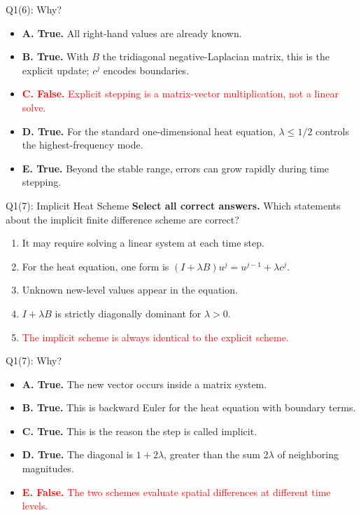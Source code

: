 \documentclass{beamer}
\newcommand{\wrong}[1]{\textcolor{red}{#1}}
\begin{document}
\begin{frame}{Q1(6): Why?}
\small
\begin{itemize}
\item \textbf{A. True.} All right-hand values are already known.
\item \textbf{B. True.} With $B$ the tridiagonal negative-Laplacian
matrix, this is the explicit update; $c^j$ encodes boundaries.
\item \wrong{\textbf{C. False.} Explicit stepping is a matrix-vector
multiplication, not a linear solve.}
\item \textbf{D. True.} For the standard one-dimensional heat
equation, $\lambda\leq1/2$ controls the highest-frequency mode.
\item \textbf{E. True.} Beyond the stable range, errors can grow
rapidly during time stepping.
\end{itemize}
\end{frame}

\begin{frame}{Q1(7): Implicit Heat Scheme}
\small
\textbf{Select all correct answers.} Which statements about the
implicit finite difference scheme are correct?
\begin{enumerate}
\item[A.] It may require solving a linear system at each time step.
\item[B.] For the heat equation, one form is
$(I+\lambda B)u^j=u^{j-1}+\lambda c^j$.
\item[C.] Unknown new-level values appear in the equation.
\item[D.] $I+\lambda B$ is strictly diagonally dominant for $\lambda>0$.
\item[\wrong{E.}] \wrong{The implicit scheme is always identical
to the explicit scheme.}
\end{enumerate}
\end{frame}

\begin{frame}{Q1(7): Why?}
\small
\begin{itemize}
\item \textbf{A. True.} The new vector occurs inside a matrix system.
\item \textbf{B. True.} This is backward Euler for the heat
equation with boundary terms.
\item \textbf{C. True.} This is the reason the step is called implicit.
\item \textbf{D. True.} The diagonal is $1+2\lambda$, greater than
the sum $2\lambda$ of neighboring magnitudes.
\item \wrong{\textbf{E. False.} The two schemes evaluate spatial
differences at different time levels.}
\end{itemize}
\end{frame}
\end{document}
